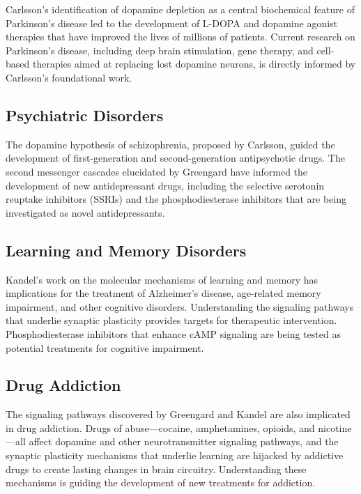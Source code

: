 Carlsson's identification of dopamine depletion as a central biochemical feature of Parkinson's disease led to the development of L-DOPA and dopamine agonist therapies that have improved the lives of millions of patients. Current research on Parkinson's disease, including deep brain stimulation, gene therapy, and cell-based therapies aimed at replacing lost dopamine neurons, is directly informed by Carlsson's foundational work.

\subsection{Psychiatric Disorders}

The dopamine hypothesis of schizophrenia, proposed by Carlsson, guided the development of first-generation and second-generation antipsychotic drugs. The second messenger cascades elucidated by Greengard have informed the development of new antidepressant drugs, including the selective serotonin reuptake inhibitors (SSRIs) and the phosphodiesterase inhibitors that are being investigated as novel antidepressants.

\subsection{Learning and Memory Disorders}

Kandel's work on the molecular mechanisms of learning and memory has implications for the treatment of Alzheimer's disease, age-related memory impairment, and other cognitive disorders. Understanding the signaling pathways that underlie synaptic plasticity provides targets for therapeutic intervention. Phosphodiesterase inhibitors that enhance cAMP signaling are being tested as potential treatments for cognitive impairment.

\subsection{Drug Addiction}

The signaling pathways discovered by Greengard and Kandel are also implicated in drug addiction. Drugs of abuse---cocaine, amphetamines, opioids, and nicotine---all affect dopamine and other neurotransmitter signaling pathways, and the synaptic plasticity mechanisms that underlie learning are hijacked by addictive drugs to create lasting changes in brain circuitry. Understanding these mechanisms is guiding the development of new treatments for addiction.

